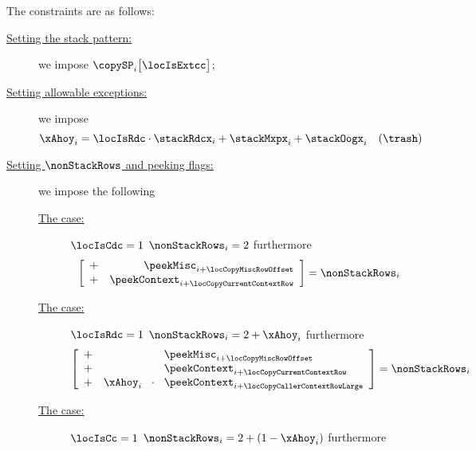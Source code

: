 \begin{center}
\end{center}
The constraints are as follows:
\begin{description}
	\item[\underline{\underline{Setting the stack pattern:}}]
		we impose $\copySP_{i} \big[ \locIsExtcc \big]$;
	\item[\underline{\underline{Setting allowable exceptions:}}]
		we impose
		\[ \xAhoy _{i} = \locIsRdc \cdot \stackRdcx _{i} + \stackMxpx _{i} + \stackOogx _{i} \quad (\trash) \]
	\item[\underline{\underline{Setting $\nonStackRows$ and peeking flags:}}] we impose the following
		\begin{description}
			\item[\underline{The  case:}]
				\If $\locIsCdc   = 1$ \Then $\nonStackRows_{i} = 2$ furthermore
				\[
					\left[ \begin{array}{cr}
						+ & \peekMisc      _{i + \locCopyMiscRowOffset     } \\
						+ & \peekContext   _{i + \locCopyCurrentContextRow } \\
					\end{array} \right]
					= \nonStackRows_{i}
				\]
			\item[\underline{The  case:}]
				\If   $\locIsRdc   = 1$
				\Then $\nonStackRows _{i} = 2 + \xAhoy _{i}$
				furthermore
				\[
					\left[ \begin{array}{crcl}
						+ &             &                   & \peekMisc    _{i + \locCopyMiscRowOffset}         \\
						+ &             &                   & \peekContext _{i + \locCopyCurrentContextRow}     \\
						+ & \xAhoy _{i} & \!\!\!\cdot\!\!\! & \peekContext _{i + \locCopyCallerContextRowLarge} \\
					\end{array} \right]
					= \nonStackRows_{i}
				\]
			\item[\underline{The  case:}]
				\If $\locIsCc    = 1$ \Then $\nonStackRows_{i} = 2 + (1 - \xAhoy_{i})$ furthermore

\end{description}
\end{description}
